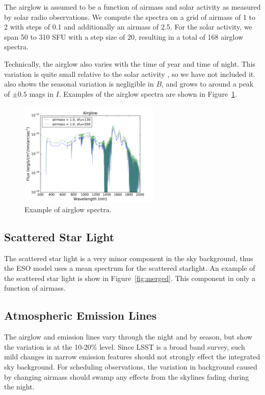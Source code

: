 \documentclass[]{spie}
\begin{document}
The airglow is assumed to be a function of airmass and solar activity as measured by solar radio observations.  We compute the spectra on a grid of airmass of 1 to 2 with steps of 0.1 and additionally an airmass of 2.5.  For the solar activity, we span 50 to 310 SFU with a step size of 20, resulting in a total of 168 airglow spectra. 

Technically, the airglow also varies with the time of year and time of night.  This variation is quite small relative to the solar activity \cite{Noll12}, so we have not included it.  \cite{Patat08} also shows the seasonal variation is negligible in $B$, and grows to around a peak of $\pm0.5$ mags in $I$. Examples of the airglow spectra are shown in Figure~\ref{fig:airglow}.

\begin{figure}
  \includegraphics[height=5cm]{plots/airglow.pdf}
  \caption{Example of airglow spectra. \label{fig:airglow}}
\end{figure}

  

\subsection{Scattered Star Light}

The scattered star light is a very minor component in the sky background, thus the ESO model uses a mean spectrum for the scattered starlight.  An example of the scattered star light is show in Figure~\ref{fig:merged}. This component in only a function of airmass.


\subsection{Atmospheric Emission Lines}

The airglow and emission lines vary through the night and by season, but \cite{Noll12} show the variation is at the 10-20\% level.  Since LSST is a broad band survey, such mild changes in narrow emission features should not strongly effect the integrated sky background.  For scheduling observations, the variation in background caused by changing airmass should swamp any effects from the skylines fading during the night.
\end{document}
